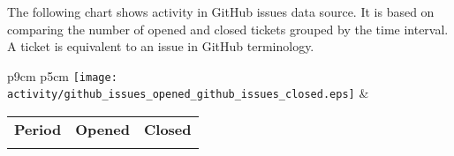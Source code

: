 The following chart shows activity in GitHub issues data source. It is based on comparing the number of opened and closed tickets grouped by the time interval. A ticket is equivalent to an issue in GitHub terminology.

\begin{tabular}{p{9cm} p{5cm}}
	\vspace{0pt} 
	\hspace*{-6cm}  
	\texttt{[image: activity/github\_issues\_opened\_github\_issues\_closed.eps]}
	& 
	\vspace{0pt}
	\begin{tabular}{l|r|r|}%
		\bfseries Period & \bfseries Opened & \bfseries Closed %
		\csvreader[head to column names]{activity/github_issues_opened_github_issues_closed.csv}{}%
		{\\\Date & \opened & \closed}
	\end{tabular}
\end{tabular}